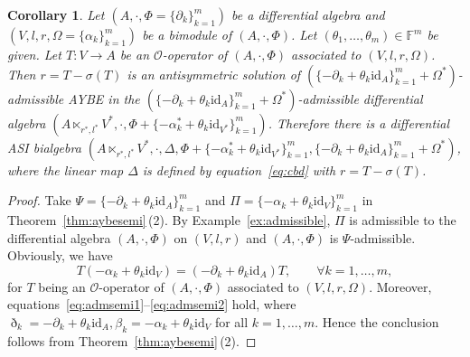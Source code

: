 \documentclass[pdftex]{sigma}
\numberwithin{equation}{section}
\newtheorem{Corollary}[Theorem]{Corollary}
\newcommand{\id}{\mathrm{id}}
\begin{document}
\begin{Corollary}\label{cor:qminp}
 Let $(A, \cdot, \Phi = \{\partial_k\}_{k=1}^m)$ be a differential algebra and
 $(V, l, r, \Omega = \{\alpha_k\}_{k=1}^m)$ be a bimodule of $(A, \cdot, \Phi)$.
 Let $(\theta_1, \dots, \theta_m) \in \mathbb{F}^m$ be given.
 Let $T\colon V \to A$ be an $\mathcal{O}$-operator of $(A, \cdot, \Phi)$ associated to $(V, l, r,
 \Omega)$.
 Then $r = T - \sigma(T)$ is an antisymmetric solution of $(\{-\partial_k + \theta_k \id_A\}_{k=1}^m + \Omega^*)$-admissible AYBE
 in the
 $(\{-\partial_k + \theta_k \id_A\}_{k=1}^m + \Omega^*)$-admissible
 differential algebra $(A \ltimes_{r^*, l^*}V^*, \cdot ,\Phi + \{-\alpha_k^* + \theta_k \id_{V^*}\}_{k=1}^m)$.
 Therefore there is a differential ASI bialgebra
 $(A \ltimes_{r^*, l^*}V^*,\allowbreak \cdot, \Delta, \Phi + \{-\alpha_k^* + \theta_k \id_{V^*}\}_{k=1}^m, \{-\partial_k + \theta_k \id_A\}_{k=1}^m + \Omega^*)$,
 where the linear map $\Delta$ is defined by equation~\eqref{eq:cbd} with $r = T - \sigma(T)$.
\end{Corollary}
\begin{proof}
 Take $\Psi = \{-\partial_k + \theta_k \id_A\}_{k=1}^m$ and $\Pi = \{-\alpha_k + \theta_k \id_V\}_{k=1}^m$ in Theorem~\ref{thm:aybesemi}\,(2).
 By Example~\ref{ex:admissible},
 $\Pi$ is admissible to the differential algebra $(A,\cdot,\Phi)$ on $(V,l,r)$ and $(A,\cdot, \Phi)$ is $\Psi$-admissible.
 Obviously, we have
 \begin{equation*}
 T (-\alpha_k + \theta_k \id_V) = (-\partial_k + \theta_k \id_A) T, \qquad \forall k=1, \dots, m,
 \end{equation*}
 for $T$ being an $\mathcal{O}$-operator of $(A, \cdot, \Phi)$ associated to $(V, l, r, \Omega)$.
 Moreover, equations~\eqref{eq:admsemi1}--\eqref{eq:admsemi2} hold, where $\eth_k=-\partial_k + \theta_k \id_A, \beta_k=-\alpha_k + \theta_k \id_V$ for all $k=1,\dots, m$.
 Hence the conclusion follows from Theorem~\ref{thm:aybesemi}\,(2).
\end{proof}
\end{document}
